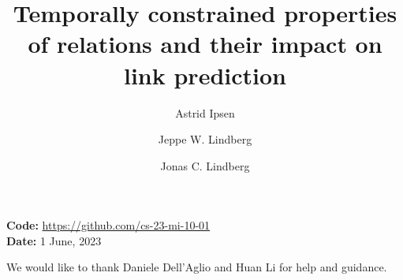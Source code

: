 \documentclass[sigconf,screen,nonacm=true]{acm_files/acmart}
\begin{document}
\fancyfoot[C]{\thepage/\pageref*{TotPages}}
\title{Temporally constrained properties of relations and their impact on link prediction}
\renewcommand{\footskip}{16mm}

\author{Astrid Ipsen}

\author{Jeppe W. Lindberg}

\author{Jonas C. Lindberg}

\begin{abstract}
\missing
\end{abstract}

%

\maketitle


\textbf{Code:} \url{https://github.com/cs-23-mi-10-01}
\\
\textbf{Date:} 1 June, 2023














\begin{acks}
    We would like to thank Daniele Dell'Aglio and Huan Li for help and guidance.
\end{acks}




\pagebreak
\appendix



\end{document}
